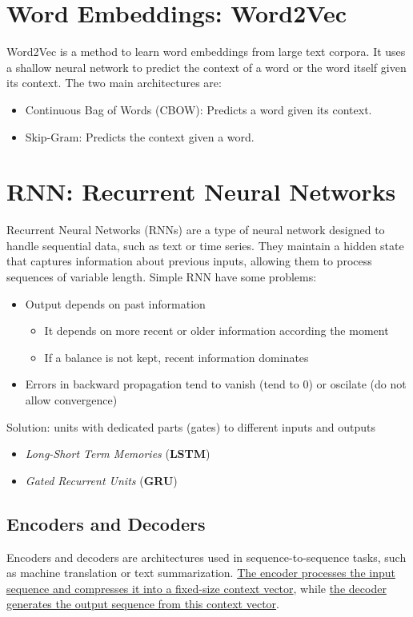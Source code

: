 \section{Word Embeddings: Word2Vec}
Word2Vec is a method to learn word embeddings from large text corpora.
It uses a shallow neural network to predict the context of a word or the word itself given its
context. The two main architectures are:
\begin{itemize}
   \item Continuous Bag of Words (CBOW): Predicts a word given its context.
   \item Skip-Gram: Predicts the context given a word.
\end{itemize}


\section{RNN: Recurrent Neural Networks}
Recurrent Neural Networks (RNNs) are a type of neural network designed to handle sequential data, such as text or time series. They maintain a hidden state that captures information about previous inputs, allowing them to process sequences of variable length.
Simple RNN have some problems:
\begin{itemize}
   \item Output depends on past information
   \begin{itemize}
      \item It depends on more recent or older information according the moment
      \item If a balance is not kept, recent information dominates
   \end{itemize}
\item  Errors in backward propagation tend to vanish (tend to 0) or oscilate (do not allow convergence)
\end{itemize}

Solution: units with dedicated parts (gates) to different inputs and outputs
\begin{itemize}
	\item \textit{Long-Short Term Memories} (\textbf{LSTM})
	\item \textit{Gated Recurrent Units} (\textbf{GRU})
\end{itemize}

\subsection{Encoders and Decoders}
Encoders and decoders are architectures used in sequence-to-sequence tasks, such as machine translation  or text summarization. \ul{The encoder processes the input sequence and compresses it into a fixed-size context vector}, while \ul{the decoder generates the output sequence from this context vector}.

